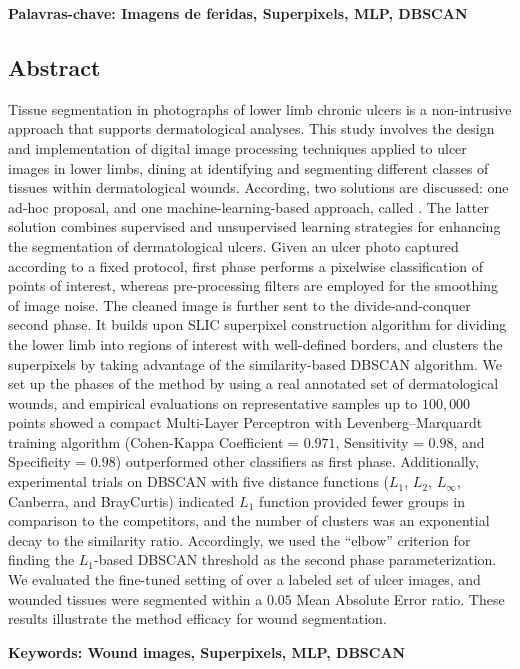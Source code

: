 \vspace{1cm}
\noindent \textbf{Palavras-chave: Imagens de feridas, Superpixels, MLP, DBSCAN }


\newpage
\blankpage

\begin{center}
    \section*{Abstract}
\end{center}

\noindent
Tissue segmentation in photographs of lower limb chronic ulcers is a non-intrusive approach that supports dermatological analyses.
This study involves the design and implementation of digital image processing techniques  applied to ulcer images in lower limbs, dining at identifying and segmenting different classes of tissues within dermatological wounds.
According, two solutions are discussed: one ad-hoc proposal, and one machine-learning-based approach, called \system.
The latter solution combines supervised and unsupervised learning strategies for enhancing the segmentation of dermatological ulcers.
Given an ulcer photo captured according to a fixed protocol, \system first phase performs a pixelwise classification of points of interest, whereas pre-processing filters are employed for the smoothing of image noise.
The cleaned image is further sent to the \system divide-and-conquer second phase.
It builds upon SLIC superpixel construction algorithm for dividing the lower limb into regions of interest with well-defined borders, and clusters the superpixels by taking advantage of the similarity-based DBSCAN algorithm.
We set up the phases of the method by using a real annotated set of dermatological wounds, and empirical evaluations on representative samples up to $100{,}000$ points showed a compact Multi-Layer Perceptron with Levenberg--Marquardt training algorithm (Cohen-Kappa Coefficient = $0.971$, Sensitivity = $0.98$, and Specificity = $0.98$) outperformed other classifiers as \system first phase.
Additionally, experimental trials on DBSCAN with five distance functions ($L_1$, $L_2$, $L_\infty$, Canberra, and BrayCurtis) indicated $L_1$ function provided fewer groups in comparison to the competitors, and the number of clusters was an exponential decay to the similarity ratio.
Accordingly, we used the ``elbow'' criterion for finding the $L_1$-based DBSCAN threshold as the \system second phase parameterization.
We evaluated the fine-tuned setting of \system over a labeled set of ulcer images, and wounded tissues were segmented within a $0.05$ Mean Absolute Error ratio.
These results illustrate the method efficacy for wound segmentation.

\vspace{1cm}
\noindent \textbf{Keywords: Wound images, Superpixels, MLP, DBSCAN}
